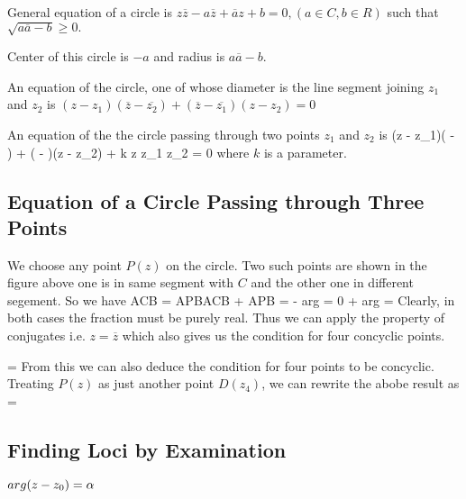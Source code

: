 \noindent General equation of a circle is $z\overline{z} - a\overline{z} + \overline{a}z + b = 0, (a\in C, b\in R)$ such that $\sqrt{a\overline{a} - b}\geq 0.$

\noindent Center of this circle is $-a$ and radius is $a\overline{a} - b.$

\noindent An equation of the circle, one of whose diameter is the line segment joining $z_1$ and $z_2$ is $(z - z_1)(\overline{z} - \overline{z_2}) + (\overline{z} - \overline{z_1})(z - z_2) = 0$

\noindent An equation of the the circle passing through two points $z_1$ and $z_2$ is
\startformula (z - z_1)( - ) + ( - )(z - z_2) + k \startdeterminant \NC z \NC {} \NR\NC z_1
  \NC {} \NR\NC z_2 \NC {}  \NR\stopdeterminant = 0\stopformula
where $k$ is a parameter.

\subsection{Equation of a Circle Passing through Three Points}

\startplacefigure[title={Circle through three points}]
\stopplacefigure

We choose any point $P(z)$ on the circle. Two such points are shown in the figure above one is in same segment with $C$
and the other one in different segement. So we have
\startformula \angle ACB = \angle APB\;\;\angle ACB + \angle APB = \pi\stopformula
\startformula \arg{} - arg = 0\;\;\arg{} + arg = \pi\stopformula
Clearly, in both cases the fraction must be purely real. Thus we can apply the property of conjugates i.e. $z = \overline{z}$ which
also gives us the condition for four concyclic points.

\startformula \Rightarrow {} = \stopformula
From this we can also deduce the condition for four points to be concyclic. Treating $P(z)$ as just another point $D(z_4)$, we can
rewrite the abobe result as
\startformula {} = \stopformula

\subsection{Finding Loci by Examination}
\startitemize[n]
\item $\\arg(z - z_0) = \alpha$


